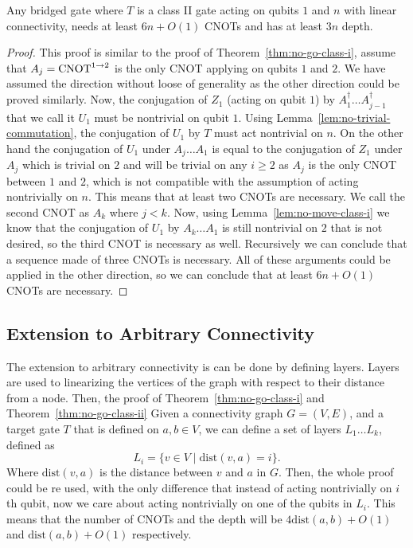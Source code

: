 \begin{theorem}\label{thm:no-go-class-ii}
  Any bridged gate where $T$ is a class II gate acting on qubits $1$ and $n$ with linear connectivity, needs at least $6n + O(1)$ CNOTs and has at least $3n$ depth.
\end{theorem}
\begin{proof}
  This proof is similar to the proof of Theorem~\ref{thm:no-go-class-i}, 
  assume that $A_j = \operatorname{CNOT}^{1 \to 2}$ is the only CNOT applying on qubits $1$ and $2$. We have assumed the direction without loose of generality as the other direction could be proved similarly. Now, the conjugation of $Z_1$ (acting on qubit $1$) by $A^\dagger_1 \dots A^\dagger_{j-1}$ that we call it $U_1$ must be nontrivial on qubit $1$. Using Lemma~\ref{lem:no-trivial-commutation}, the conjugation of $U_1$ by $T$ must act nontrivial on $n$. On the other hand the conjugation of $U_1$ under $A_j\dots A_1$ is equal to the conjugation of $Z_1$ under $A_j$ which is trivial on $2$ and will be trivial on any $i \ge 2$ as $A_j$ is the only CNOT between $1$ and $2$, which is not compatible with the assumption of acting nontrivially on $n$. This means that at least two CNOTs are necessary. We call the second CNOT as $A_k$ where $j < k$. Now, using Lemma~\ref{lem:no-move-class-i} we know that the conjugation of $U_1$ by $A_k\dots A_1$ is still nontrivial on $2$ that is not desired, so the third CNOT is necessary as well. Recursively we can conclude that a sequence made of three CNOTs is necessary. All of these arguments could be applied in the other direction, so we can conclude that at least $6n + O(1)$ CNOTs are necessary. 
\end{proof}
\subsection{Extension to Arbitrary Connectivity}

The extension to arbitrary connectivity is can be done by defining layers. Layers are used to linearizing the vertices of the graph with respect to their distance from a node. Then, the proof of Theorem~\ref{thm:no-go-class-i} and Theorem~\ref{thm:no-go-class-ii}
 Given a connectivity graph $G = (V, E)$, and a target gate $T$ that is defined on $a,b \in V$, we can define a set of layers $L_1 \dots L_k$, defined as
\begin{equation}
  L_i = \{ v \in V \mid \mathrm{dist}(v, a) = i \}.
\end{equation}
Where $\mathrm{dist}(v, a)$ is the distance between $v$ and $a$ in $G$. Then, the whole proof could be re used, with the only difference that instead of acting nontrivially on $i$th qubit, now we care about acting nontrivially on one of the qubits in $L_i$. This means that the number of CNOTs and the depth will be $4\mathrm{dist}(a,b) + O(1)$ and $\mathrm{dist}(a,b) + O(1)$ respectively. 

